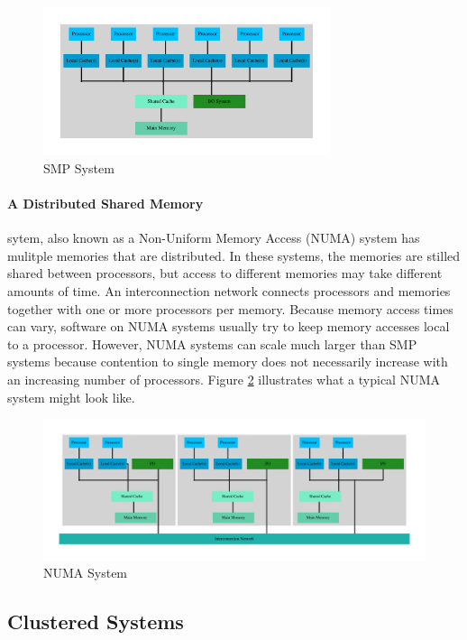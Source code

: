 \documentclass[11pt]{book}
\begin{document}
\begin{figure}[H]
    \centering
    \includegraphics[width=0.75\textwidth,quiet]{figs/graphviz/smp.pdf}
    \caption{SMP System}\label{smp}
\end{figure}

\paragraph{A Distributed Shared Memory} sytem, also known as a Non-Uniform Memory Access
(NUMA) system has mulitple memories that are distributed. In these systems, the memories are
stilled shared between processors, but access to different memories may take different amounts
of time. An interconnection network connects processors and memories together with one or
more processors per memory. Because memory access times can vary, software on NUMA systems
usually try to keep memory accesses local to a processor. However, NUMA systems can scale
much larger than SMP systems because contention to single memory does not necessarily increase
with an increasing number of processors. Figure \ref{distributed} illustrates what a typical
NUMA system might look like.

\begin{figure}[H]
    \centering
    \includegraphics[width=\textwidth,quiet]{figs/graphviz/distributed.pdf}
    \caption{NUMA System}\label{distributed}
\end{figure}

\subsection{Clustered Systems}
\end{document}
